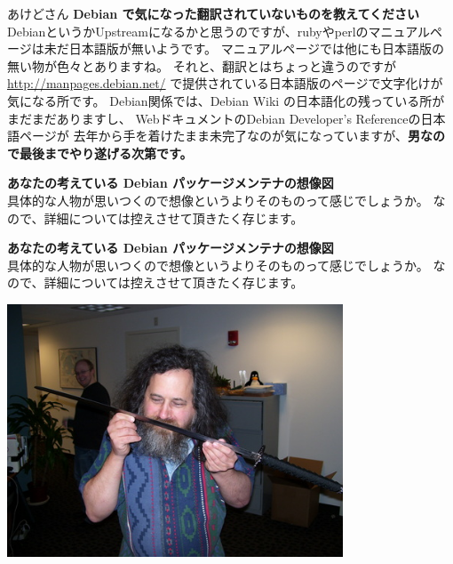\documentclass[cjk,dvipdfmx,12pt]{beamer}
\begin{document}
\begin{frame}{あけどさん}
\textbf{Debian で気になった翻訳されていないものを教えてください}\\
DebianというかUpstreamになるかと思うのですが、rubyやperlのマニュアルページは未だ日本語版が無いようです。
マニュアルページでは他にも日本語版の無い物が色々とありますね。
それと、翻訳とはちょっと違うのですが
\url{http://manpages.debian.net/} で提供されている日本語版のページで文字化けが気になる所です。
Debian関係では、Debian Wiki の日本語化の残っている所がまだまだありますし、
WebドキュメントのDebian Developer's Referenceの日本語ページが
去年から手を着けたまま未完了なのが気になっていますが、\textbf{男なので最後までやり遂げる次第です。}

\end{frame}

\begin{frame}
\textbf{あなたの考えている Debian パッケージメンテナの想像図}\\
具体的な人物が思いつくので想像というよりそのものって感じでしょうか。
なので、詳細については控えさせて頂きたく存じます。
\end{frame}

\begin{frame}
\textbf{あなたの考えている Debian パッケージメンテナの想像図}\\
具体的な人物が思いつくので想像というよりそのものって感じでしょうか。
なので、詳細については控えさせて頂きたく存じます。
\begin{center}
\includegraphics[width=10cm]{image200809/rms_katana.jpg}
\end{center}
\end{frame}
\end{document}
